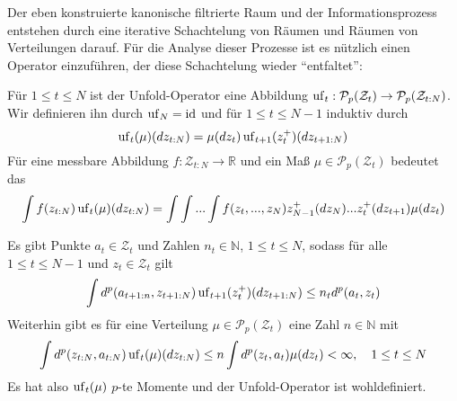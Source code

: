 Der eben konstruierte kanonische filtrierte Raum und der Informationsprozess entstehen durch eine iterative Schachtelung von Räumen und Räumen von Verteilungen darauf. Für die Analyse dieser Prozesse ist es nützlich einen Operator einzuführen, der diese Schachtelung wieder ``entfaltet'':
\begin{definition}
Für $1\leq t\leq N$ ist der Unfold-Operator eine Abbildung $\operatorname{uf}_t:\mathcal{P}_p(\mathcal{Z}_t) \rightarrow \mathcal{P}_p(\mathcal{Z}_{t:N})$. Wir definieren ihn durch $\operatorname{uf}_N=\operatorname{id}$ und für $1\leq t\leq N-1$ induktiv durch
$$\operatorname{uf}_{t}(\mu)(dz_{t:N})=\mu(dz_t)\operatorname{uf}_{t+1}(z_t^+)(dz_{t+1:N})$$
Für eine messbare Abbildung $f:\mathcal{Z}_{t:N}\rightarrow \mathbb{R}$ und ein Maß $\mu\in\mathcal{P}_p(\mathcal{Z}_t)$ bedeutet das
$$\int f(z_{t:N}) \operatorname{uf}_t(\mu)(dz_{t:N}) = \int\int ...\int f(z_t,...,z_N)z^+_{N-1}(dz_N)...z_{t}^+(dz_{t+1})\mu(dz_t)$$
\end{definition}
\begin{lemma}\label{thm:bounded_unfold}
    Es gibt Punkte $a_t \in \mathcal{Z}_t$ und Zahlen $n_t \in \mathbb{N}$, $1\leq t\leq N$, sodass für alle $1\leq t\leq N-1$ und $z_t \in \mathcal{Z}_t$ gilt
    $$\int d^p(a_{t+1:n}, z_{t+1:N}) \operatorname{uf}_{t+1}(z_t^+)(dz_{t+1:N})\leq n_td^p(a_t, z_t)$$
    Weiterhin gibt es für eine Verteilung $\mu \in \mathcal{P}_p(\mathcal{Z}_t)$ eine Zahl $n\in \mathbb{N}$ mit
    $$\int d^p(z_{t:N}, a_{t:N})\operatorname{uf}_t(\mu)(dz_{t:N})\leq n\int d^p(z_t, a_t)\mu(dz_t)< \infty, \quad 1\leq t\leq N$$ 
    Es hat also $\operatorname{uf}_t(\mu)$ $p$-te Momente und der Unfold-Operator ist wohldefiniert.
\end{lemma}
